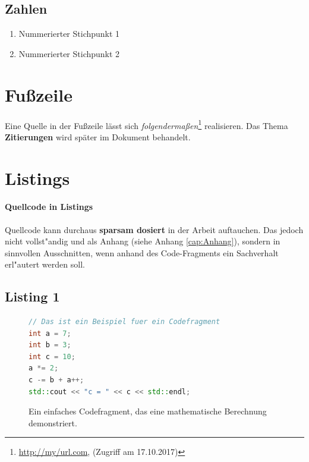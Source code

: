 \subsection{Zahlen}
\label{subsec:Zahlen}

\begin{enumerate}
\item Nummerierter Stichpunkt 1
\item Nummerierter Stichpunkt 2
\end{enumerate}


\section{Fu{\ss}zeile}
\label{sec:Fusszeile}

Eine Quelle in der Fußzeile lässt sich \textit{folgendermaßen}\footnote{\url{http://my/url.com}, (Zugriff am 17.10.2017)} realisieren. Das Thema \textbf{Zitierungen} wird später im Dokument behandelt.

\section{Listings}
\label{sec:Listings}

\paragraph{Quellcode in Listings}
Quellcode kann durchaus \textbf{sparsam dosiert} in der Arbeit auftauchen.
Das jedoch nicht vollst"andig und als Anhang (siehe Anhang \ref{cap:Anhang}), sondern in sinnvollen Ausschnitten, wenn anhand des Code-Fragments ein Sachverhalt erl"autert werden soll.

\subsection{Listing 1}
\label{subsec:Listing1}

\FloatBarrier
\begin{figure}[htb]
\begin{lstlisting}[language=C++, breaklines=true, basicstyle=\small, numbers=none]
// Das ist ein Beispiel fuer ein Codefragment
int a = 7;
int b = 3;
int c = 10;
a *= 2;
c -= b + a++;
std::cout << "c = " << c << std::endl;
\end{lstlisting}
  \caption[Beispiel eines einfachen Codefragments.]{Ein einfaches Codefragment, das eine mathematische Berechnung demonstriert.}
\label{lst:Codefragment}
\end{figure}


